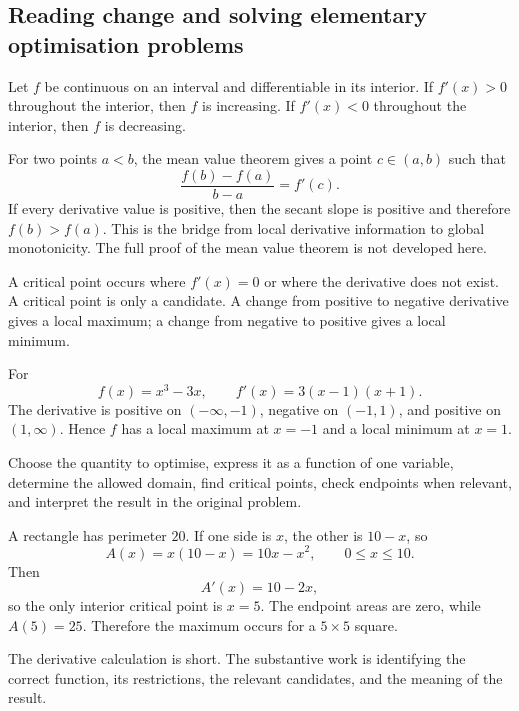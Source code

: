 \subsection{Reading change and solving elementary optimisation problems}

\begin{theorembox}
Let $f$ be continuous on an interval and differentiable in its interior. If $f'(x)>0$ throughout the interior, then $f$ is increasing. If $f'(x)<0$ throughout the interior, then $f$ is decreasing.
\end{theorembox}

\begin{interpretationbox}
For two points $a<b$, the mean value theorem gives a point $c\in(a,b)$ such that
\[
\frac{f(b)-f(a)}{b-a}=f'(c).
\]
If every derivative value is positive, then the secant slope is positive and therefore $f(b)>f(a)$. This is the bridge from local derivative information to global monotonicity. The full proof of the mean value theorem is not developed here.
\end{interpretationbox}

A critical point occurs where $f'(x)=0$ or where the derivative does not exist. A critical point is only a candidate. A change from positive to negative derivative gives a local maximum; a change from negative to positive gives a local minimum.

\begin{examplebox}
For
\[
f(x)=x^3-3x,
\qquad
f'(x)=3(x-1)(x+1).
\]
The derivative is positive on $(-\infty,-1)$, negative on $(-1,1)$, and positive on $(1,\infty)$. Hence $f$ has a local maximum at $x=-1$ and a local minimum at $x=1$.
\end{examplebox}

\begin{corebox}
Choose the quantity to optimise, express it as a function of one variable, determine the allowed domain, find critical points, check endpoints when relevant, and interpret the result in the original problem.
\end{corebox}

\begin{examplebox}
A rectangle has perimeter $20$. If one side is $x$, the other is $10-x$, so
\[
A(x)=x(10-x)=10x-x^2,
\qquad 0\le x\le10.
\]
Then
\[
A'(x)=10-2x,
\]
so the only interior critical point is $x=5$. The endpoint areas are zero, while $A(5)=25$. Therefore the maximum occurs for a $5\times5$ square.
\end{examplebox}

The derivative calculation is short. The substantive work is identifying the correct function, its restrictions, the relevant candidates, and the meaning of the result.
